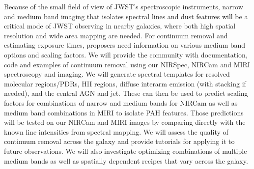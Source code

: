 \documentclass[12pt]{article}
\begin{document}

\vspace{0.05in}

 Because of the small field of view of JWST's spectroscopic instruments, narrow and medium band imaging that isolates spectral lines and dust features will be a critical mode of JWST observing in nearby galaxies, where both high spatial resolution and wide area mapping are needed. For continuum removal and estimating exposure times, proposers need information on various medium band options and scaling factors. We will provide the community with documentation, code and examples of continuum removal using our NIRSpec, NIRCam and MIRI spectroscopy and imaging. We will generate spectral templates for resolved molecular regions/PDRs, H{\small II} regions, diffuse interarm emission (with stacking if needed), and the central AGN and jet. These can then be used to predict scaling factors for combinations of narrow and medium bands for NIRCam as well as medium band combinations in MIRI to isolate PAH features.  Those predictions will be tested on our NIRCam and MIRI images by comparing directly with the known line intensities from spectral mapping.  We will assess the quality of continuum removal across the galaxy and provide tutorials for applying it to future observations. We will also investigate optimizing combinations of multiple medium bands as well as spatially dependent recipes that vary across the galaxy.
\end{document}
